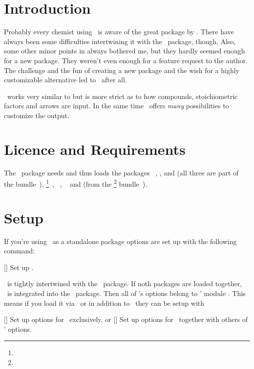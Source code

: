 \documentclass[load-preamble+]{cnltx-doc}
\begin{document}
\section{Introduction}
Probably every chemist using \LaTeXe\ is aware of the great 
package by \hensel.  There have always been some difficulties intertwining it
with the \chemmacros\ package, though.  Also, some other minor points in
 always bothered me, but they hardly seemed enough for a new
package.  They weren't even enough for a feature request to the 
author.  The challenge and the fun of creating a new package and the wish for
a highly customizable alternative led to \chemformula\ after all.

\chemformula\ works very similar to  but is more strict as to how
compounds, stoichiometric factors and arrows are input.  In the same time
\chemformula\ offers \emph{many} possibilities to customize the output.

\section{Licence and Requirements}
\license

The \chemformula\ package needs and thus loads the packages
~\cite{bnd:l3kernel}, ,  and
 (all three are part of the 
bundle~\cite{bnd:l3packages}),
\footnote{}~\cite{pkg:pgf},
~\cite{pkg:amstext}, ~\cite{pkg:nicefrac} and
 (from the \KOMAScript\footnote{}
bundle~\cite{bnd:koma-script}).

\section{Setup}

If you're using \chemformula\ as a standalone package options are set up with
the following command:
\begin{commands}
  []
    Set up \chemformula.
\end{commands}

\chemformula\ is tightly intertwined with the \chemmacros\ package.  If noth
packages are loaded together, \chemformula\ is integrated into the
\chemmacros\ package.  Then all of \chemformula's options belong to
\chemmacros' module .  This means if you load it via
\chemmacros\ or in addition to \chemmacros\ they can be setup with
\begin{commands}
  []
    Set up options for \chemformula\ exclusively, or
  []
    Set up options for \chemformula\ together with others of \chemmacros'
    options.
\end{commands}
\end{document}

